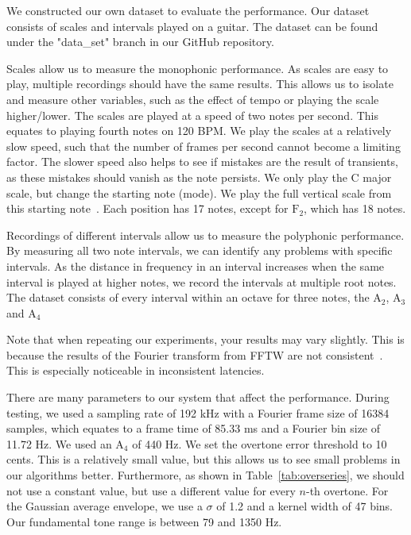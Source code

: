 \documentclass[10pt,twocolumn]{article}
\begin{document}
We constructed our own dataset to evaluate the performance. Our dataset consists of scales and intervals played on a guitar. The dataset can be found under the "data\_set" branch in our GitHub repository.

Scales allow us to measure the monophonic performance. As scales are easy to play, multiple recordings should have the same results. This allows us to isolate and measure other variables, such as the effect of tempo or playing the scale higher/lower. The scales are played at a speed of two notes per second. This equates to playing fourth notes on 120 BPM. We play the scales at a relatively slow speed, such that the number of frames per second cannot become a limiting factor. The slower speed also helps to see if mistakes are the result of transients, as these mistakes should vanish as the note persists. We only play the C major scale, but change the starting note (mode). We play the full vertical scale from this starting note~\cite{scale}. Each position has 17 notes, except for $\text{F}_2$, which has 18 notes.

Recordings of different intervals allow us to measure the polyphonic performance. By measuring all two note intervals, we can identify any problems with specific intervals. As the distance in frequency in an interval increases when the same interval is played at higher notes, we record the intervals at multiple root notes. The dataset consists of every interval within an octave for three notes, the $\text{A}_2$, $\text{A}_3$ and $\text{A}_4$%

Note that when repeating our experiments, your results may vary slightly. This is because the results of the Fourier transform from FFTW are not consistent~\cite{fftw}. This is especially noticeable in inconsistent latencies.

There are many parameters to our system that affect the performance. During testing, we used a sampling rate of 192 kHz with a Fourier frame size of 16384 samples, which equates to a frame time of 85.33 ms and a Fourier bin size of 11.72 Hz. We used an $\text{A}_4$ of 440 Hz. We set the overtone error threshold to 10 cents. This is a relatively small value, but this allows us to see small problems in our algorithms better. Furthermore, as shown in Table~\ref{tab:overseries}, we should not use a constant value, but use a different value for every $n$-th overtone. For the Gaussian average envelope, we use a $\sigma$ of 1.2 and a kernel width of 47 bins. Our fundamental tone range is between 79 and 1350 Hz.
\end{document}
